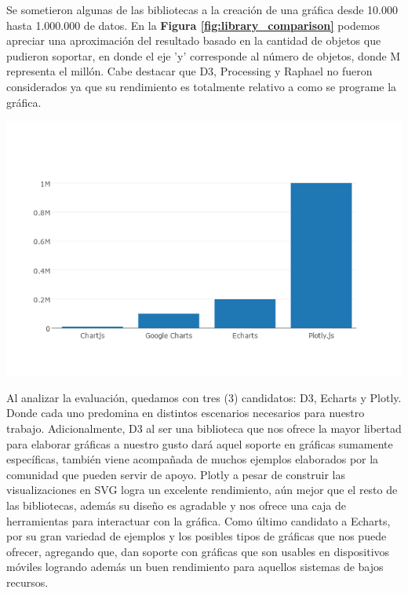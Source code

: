 \begin{itemize}
Se sometieron algunas de las bibliotecas a la creación de una gráfica desde 10.000 hasta 1.000.000 de datos. En la \textbf{Figura \ref{fig:library_comparison}} podemos apreciar una aproximación del resultado basado en la cantidad de objetos que pudieron soportar, en donde el eje 'y' corresponde al número de objetos, donde M representa el millón. Cabe destacar que D3, Processing y Raphael no fueron considerados ya que su rendimiento es totalmente relativo a como se programe la gráfica.
\begin{center}
    \bigbreak
    \includegraphics[scale=0.45]{images/marco_tecnologico/library_comparison.png}
    \label{fig:library_comparison}
    \end{center}
    \bigbreak
\end{itemize}

Al analizar la evaluación, quedamos con tres (3) candidatos: D3, Echarts y Plotly. Donde cada uno predomina en distintos escenarios necesarios para nuestro trabajo. Adicionalmente, D3 al ser una biblioteca que nos ofrece la mayor libertad para elaborar gráficas a nuestro gusto dará aquel soporte en gráficas sumamente específicas, también viene acompañada de muchos ejemplos elaborados por la comunidad que pueden servir de apoyo. Plotly a pesar de construir las visualizaciones en SVG logra un excelente rendimiento, aún mejor que el resto de las bibliotecas, además su diseño es agradable y nos ofrece una caja de herramientas para interactuar con la gráfica. Como último candidato a Echarts, por su gran variedad de ejemplos y los posibles tipos de gráficas que nos puede ofrecer, agregando que, dan soporte con gráficas que son usables en dispositivos móviles logrando además un buen rendimiento para aquellos sistemas de bajos recursos.


